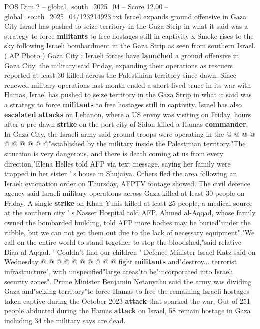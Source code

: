 \begin{textsample}{POS Dim 2 – global\_south\_2025\_04 – Score 12.00 – global\_south\_2025\_04/123214923.txt}  \label{ex:f2_pos_346}
Israel expands ground offensive in Gaza City Israel has pushed to seize territory in the Gaza Strip in what it said was a strategy to force \textbf{militants} to free hostages still in captivity x Smoke rises to the sky following Israeli bombardment in the Gaza Strip as seen from southern Israel. ( AP Photo ) Gaza City : Israeli forces have \textbf{launched} a ground offensive in Gaza City, the military said Friday, expanding their operations as rescuers reported at least 30 killed across the Palestinian territory since dawn.
Since renewed military operations last month ended a short-lived truce in its war with Hamas, Israel has pushed to seize territory in the Gaza Strip in what it said was a strategy to force \textbf{militants} to free hostages still in captivity.
Israel has also \textbf{escalated} \textbf{attacks} on Lebanon, where a US envoy was visiting on Friday, hours after a pre-dawn \textbf{strike} on the port city of Sidon killed a Hamas \textbf{commander}.
In Gaza City, the Israeli army said ground troops were operating in the @ @ @ @ @ @ @ @ @ @"established by the military inside the Palestinian territory."The situation is very dangerous, and there is death coming at us from every direction,"Elena Helles told AFP via text message, saying her family were trapped in her sister ' s house in Shujaiya.
Others fled the area following an Israeli evacuation order on Thursday, AFPTV footage showed.
The civil defence agency said Israeli military operations across Gaza killed at least 30 people on Friday.
A single \textbf{strike} on Khan Yunis killed at least 25 people, a medical source at the southern city ' s Nasser Hospital told AFP.
Ahmed al-Aqqad, whose family owned the bombarded building, told AFP more bodies may be buried"under the rubble, but we can not get them out due to the lack of necessary equipment"."We call on the entire world to stand together to stop the bloodshed,"said relative Diaa al-Aqqad. ' Couldn't find our children ' Defence Minister Israel Katz said on Wednesday @ @ @ @ @ @ @ @ @ @ fight \textbf{militants} and"destroy... terrorist infrastructure", with unspecified"large areas"to be"incorporated into Israeli security zones".
Prime Minister Benjamin Netanyahu said the army was dividing Gaza and"seizing territory"to force Hamas to free the remaining Israeli hostages taken captive during the October 2023 \textbf{attack} that sparked the war.
Out of 251 people abducted during the Hamas \textbf{attack} on Israel, 58 remain hostage in Gaza including 34 the military says are dead.

\end{textsample}
